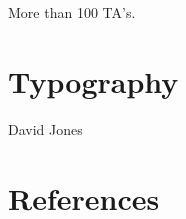 More than 100 TA's.

\section*{Typography}

David Jones\\

\section*{References}

\cite{Wilf1990}

\cite{Strang1986}

\cite{Shoup2005}

\cite{Schneierman2012}

\cite{Ross}

\cite{Polya1957}

\cite{MichaelsR1991}

\cite{HaggardSW2005}

\cite{GrinsteadS}

\cite{GrahamKP1994}

\cite{GoodaireP2001}

\cite{MR0228020}

\cite{MR1818534}

\cite{CormenLRS2009}

\cite{MR1633290}

\cite{BachS1996}

\cite{MR1723092}

\cite{MR1854128}

\cite{Gersting2003}

\cite{Biggs2002}

\cite{Ross2002}

\cite{MR2359513}

\cite{MR1952453}

\cite{Malkiel2003}

\cite{MR1344451}

\cite{MR2144605}


\endinput
